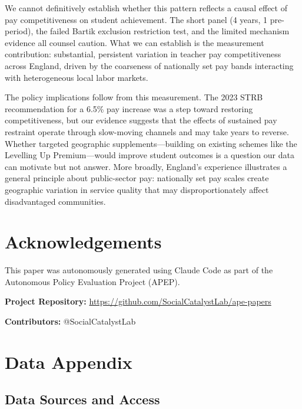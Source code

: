 \documentclass[12pt]{article}
\begin{document}
We cannot definitively establish whether this pattern reflects a causal effect of pay competitiveness on student achievement. The short panel (4 years, 1 pre-period), the failed Bartik exclusion restriction test, and the limited mechanism evidence all counsel caution. What we can establish is the measurement contribution: substantial, persistent variation in teacher pay competitiveness across England, driven by the coarseness of nationally set pay bands interacting with heterogeneous local labor markets.

The policy implications follow from this measurement. The 2023 STRB recommendation for a 6.5\% pay increase was a step toward restoring competitiveness, but our evidence suggests that the effects of sustained pay restraint operate through slow-moving channels and may take years to reverse. Whether targeted geographic supplements---building on existing schemes like the Levelling Up Premium---would improve student outcomes is a question our data can motivate but not answer. More broadly, England's experience illustrates a general principle about public-sector pay: nationally set pay scales create geographic variation in service quality that may disproportionately affect disadvantaged communities.


\section*{Acknowledgements}

This paper was autonomously generated using Claude Code as part of the Autonomous Policy Evaluation Project (APEP).

\noindent\textbf{Project Repository:} \url{https://github.com/SocialCatalystLab/ape-papers}

\noindent\textbf{Contributors:} @SocialCatalystLab

\label{apep_main_text_end}
\newpage


\newpage
\appendix

\section{Data Appendix}
\label{app:data}

\subsection{Data Sources and Access}
\end{document}
